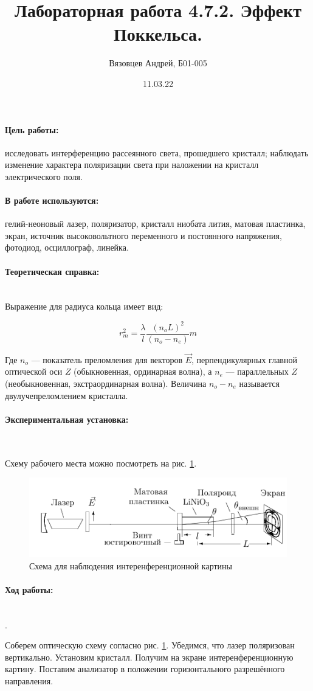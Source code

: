 \documentclass[a4paper, 12pt]{article}
\author{Вязовцев Андрей, Б01-005}
\date{11.03.22}
\title{Лабораторная работа 4.7.2. Эффект Поккельса.}
\newcommand{\parag}[1]{\paragraph*{#1:}}
\newcounter{Points}
\newcommand{\point}{\arabic{Points}. \addtocounter{Points}{1}}
\begin{document}
\maketitle

\parag {Цель работы} исследовать интерференцию рассеянного света, прошедшего кристалл; наблюдать изменение характера поляризации света при наложении на кристалл электрического поля.

\parag {В работе используются} гелий-неоновый лазер, поляризатор, кристалл ниобата лития, матовая пластинка, экран, источник высоковольтного переменного и постоянного напряжения, фотодиод, осциллограф, линейка.

\parag {Теоретическая справка} ~\\

Выражение для радиуса кольца имеет вид:

\begin{equation}
    r^2_m = \frac{\lambda}{l} \frac{(n_o L)^2}{(n_o - n_e)} m
    \label{eq:radius} 
\end{equation}

Где $n_o$ --- показатель преломления для векторов $\vec{E}$, перпендикулярных главной оптической оси $Z$ (обыкновенная, ординарная волна), а $n_e$ --- параллельных $Z$ (необыкновенная, экстраординарная волна). Величина $n_o - n_e$ называется двулучепреломлением кристалла. 

\parag {Экспериментальная установка} ~

Схему рабочего места можно посмотреть на рис. \ref{img:workplace}.

\begin{figure}[!h]
    \includegraphics[scale = 0.4]{Workplace}
    \centering
    \caption{Схема для наблюдения интеренференционной картины}
    \label{img:workplace}
\end{figure}

\parag {Ход работы} ~\\

\point Соберем оптическую схему согласно рис. \ref{img:workplace}. Убедимся, что лазер поляризован вертикально. Установим кристалл. Получим на экране интеренференционную картину. Поставим анализатор в положении горизонтального разрешённого направления.
\end{document}
